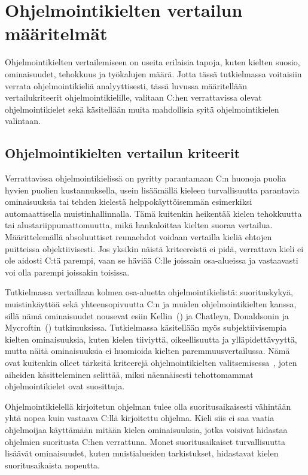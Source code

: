 \section{Ohjelmointikielten vertailun määritelmät}

Ohjelmointikielten vertailemiseen on useita erilaisia tapoja, kuten kielten
suosio, ominaisuudet, tehokkuus ja työkalujen määrä. Jotta tässä tutkielmassa
voitaisiin verrata ohjelmointikieliä analyyttisesti, tässä luvussa määritellään
vertailukriteerit ohjelmointikielille, valitaan C:hen verrattavissa olevat
ohjelmointikielet sekä käsitellään muita mahdollisia syitä ohjelmointikielen
valintaan.

\subsection{Ohjelmointikielten vertailun kriteerit}
\label{sec:abs}

Verrattavissa ohjelmointikielissä on pyritty parantamaan C:n huonoja puolia
hyvien puolien kustannuksella, usein lisäämällä kieleen turvallisuutta
parantavia ominaisuuksia tai tehden kielestä helppokäyttöisemmän esimerkiksi
automaattisella muistinhallinnalla. Tämä kuitenkin heikentää kielen tehokkuutta
tai alustariippumattomuutta, mikä hankaloittaa kielten suoraa vertailua.
Määrittelemällä absoluuttiset reunaehdot voidaan vertailla kieliä ehtojen
puitteissa objektiivisesti. Jos yksikin näistä kriteereistä ei pidä, verrattava
kieli ei ole aidosti C:tä parempi, vaan se häviää C:lle joissain osa-alueissa
ja vastaavasti voi olla parempi joissakin toisissa.

Tutkielmassa vertaillaan kolmea osa-aluetta ohjelmointikielistä: suorituskykyä,
muistinkäyttöä sekä yhteensopivuutta C:n ja muiden ohjelmointikielten kanssa,
sillä nämä ominaisuudet nousevat esiin Kellin~(\citeyear{somemeantforc}) ja
Chatleyn, Donaldsonin ja Mycroftin~(\citeyear{next7000}) tutkimuksissa.
Tutkielmassa käsitellään myös subjektiivisempia kielten ominaisuuksia, kuten
kielen tiiviyttä, oikeellisuutta ja
ylläpidettävyyttä, mutta näitä ominaisuuksia ei huomioida kielten
paremmuusvertailussa. Nämä ovat kuitenkin olleet tärkeitä kriteerejä
ohjelmointikielten valitsemisessa~\citep{empiricalpopularity}, joten aiheiden
käsitteleminen selittää, miksi näennäisesti tehottomammat ohjelmointikielet
ovat suosittuja.

Ohjelmointikielellä kirjoitetun ohjelman tulee olla suoritusaikaisesti
vähintään yhtä nopea kuin vastaava C:llä kirjoitettu ohjelma. Kieli siis ei saa
vaatia ohjelmoijaa käyttämään mitään kielen ominaisuuksia, jotka voisivat
hidastaa ohjelmien suoritusta C:hen verrattuna. Monet suoritusaikaiset
turvallisuutta lisäävät ominaisuudet, kuten muistialueiden tarkistukset,
hidastavat kielen suoritusaikaista nopeutta.


